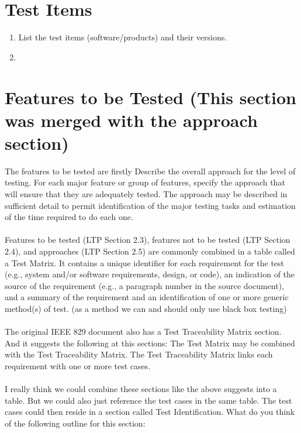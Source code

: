 \section{Test Items}

\begin{enumerate}
	\item List the test items (software/products) and their versions.
	\item 
\end{enumerate}

\section{Features to be Tested (This section was merged with the approach section)}

The features to be tested are firstly 
Describe the overall approach for the level of testing. For each major feature or group of features,
specify the approach that will ensure that they are adequately tested. The approach may be described in
sufficient detail to permit identification of the major testing tasks and estimation of the time required to
do each one.\\\\
Features to be tested (LTP Section 2.3), features not to be tested (LTP Section 2.4), and approaches
(LTP Section 2.5) are commonly combined in a table called a Test Matrix. It contains a unique
identifier for each requirement for the test (e.g., system and/or software requirements, design, or code),
an indication of the source of the requirement (e.g., a paragraph number in the source document), and a
summary of the requirement and an identification of one or more generic method(s) of test. (as a method we can and should only use black box testing)\\\\

The original IEEE 829 document also has a Test Traceability Matrix section. And it suggests the following at this sections: The Test Matrix may be combined with the Test Traceability Matrix. The Test Traceability Matrix
links each requirement with one or more test cases.\\\\

I really think we could combine these sections like the above suggests into a table. But we could also just reference the test cases in the same table. The test cases could then reside in a section called Test Identification. What do you think of the following outline for this section:\\\\

